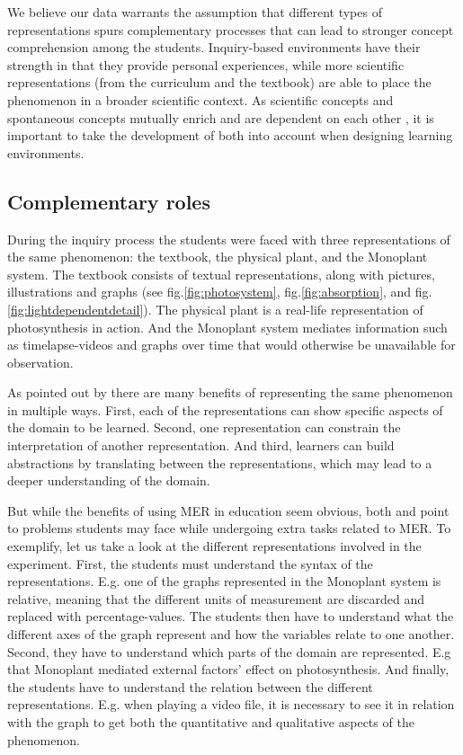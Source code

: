 We believe our data warrants the assumption that different types of representations spurs complementary processes that can lead to stronger concept comprehension among the students. Inquiry-based environments have their strength in that they provide personal experiences, while more scientific representations (from the curriculum and the textbook) are able to place the phenomenon in a broader scientific context. As scientific concepts and spontaneous concepts mutually enrich and are dependent on each other \citep{vygotsky2012thought}, it is important to take the development of both into account when designing learning environments. 

\subsection{Complementary roles}
During the inquiry process the students were faced with three representations of the same phenomenon: the textbook, the physical plant, and the Monoplant system. The textbook consists of textual representations, along with pictures, illustrations and graphs (see fig.\ref{fig:photosystem}, fig.\ref{fig:absorption}, and fig.\ref{fig:lightdependentdetail}). The physical plant is a real-life representation of photosynthesis in action. And the Monoplant system mediates information such as timelapse-videos and graphs over time that would otherwise be unavailable for observation.  

As pointed out by \citet{van2006supporting} there are many benefits of representing the same phenomenon in multiple ways. First, each of the representations can show specific aspects of the domain to be learned. Second, one representation can constrain the interpretation of another representation. And third, learners can build abstractions by translating between the representations, which may lead to a deeper understanding of the domain. 

But while the benefits of using MER in education seem obvious, both \citet{ainsworth1999functions} and \citet{van2006supporting} point to problems students may face while undergoing extra tasks related to MER. To exemplify, let us take a look at the different representations involved in the experiment. First, the students must understand the syntax of the representations. E.g. one of the graphs represented in the Monoplant system is relative, meaning that the different units of measurement are discarded and replaced with percentage-values. The students then have to understand what the different axes of the graph represent and how the variables relate to one another. Second, they have to understand which parts of the domain are represented. E.g that Monoplant mediated external factors' effect on photosynthesis. And finally, the students have to understand the relation between the different representations. E.g. when playing a video file, it is necessary to see it in relation with the graph to get both the quantitative and qualitative aspects of the phenomenon. 


